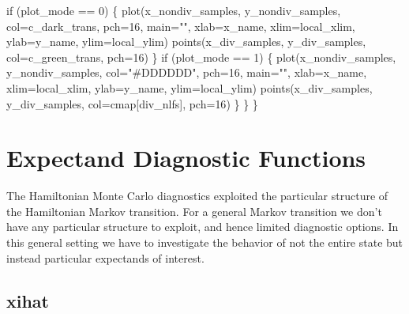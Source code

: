 \documentclass[
  letterpaper,
  DIV=11,
  numbers=noendperiod]{scrartcl}
\newenvironment{Shaded}{\begin{snugshade}}{\end{snugshade}}
\newcommand{\ControlFlowTok}[1]{\textcolor[rgb]{0.00,0.23,0.31}{#1}}
\newcommand{\DecValTok}[1]{\textcolor[rgb]{0.68,0.00,0.00}{#1}}
\newcommand{\NormalTok}[1]{\textcolor[rgb]{0.00,0.23,0.31}{#1}}
\newcommand{\OperatorTok}[1]{\textcolor[rgb]{0.37,0.37,0.37}{#1}}
\newcommand{\StringTok}[1]{\textcolor[rgb]{0.13,0.47,0.30}{#1}}
\begin{document}
\begin{Shaded}
\begin{Highlighting}[]
    \ControlFlowTok{if}\NormalTok{ (plot\_mode }\OperatorTok{==} \DecValTok{0}\NormalTok{) \{}
\NormalTok{      plot(x\_nondiv\_samples, y\_nondiv\_samples,}
\NormalTok{           col}\OperatorTok{=}\NormalTok{c\_dark\_trans, pch}\OperatorTok{=}\DecValTok{16}\NormalTok{, main}\OperatorTok{=}\StringTok{""}\NormalTok{,}
\NormalTok{           xlab}\OperatorTok{=}\NormalTok{x\_name, xlim}\OperatorTok{=}\NormalTok{local\_xlim, }
\NormalTok{           ylab}\OperatorTok{=}\NormalTok{y\_name, ylim}\OperatorTok{=}\NormalTok{local\_ylim)}
\NormalTok{      points(x\_div\_samples, y\_div\_samples,}
\NormalTok{             col}\OperatorTok{=}\NormalTok{c\_green\_trans, pch}\OperatorTok{=}\DecValTok{16}\NormalTok{)}
\NormalTok{    \}}
    \ControlFlowTok{if}\NormalTok{ (plot\_mode }\OperatorTok{==} \DecValTok{1}\NormalTok{) \{}
\NormalTok{      plot(x\_nondiv\_samples, y\_nondiv\_samples,}
\NormalTok{           col}\OperatorTok{=}\StringTok{"\#DDDDDD"}\NormalTok{, pch}\OperatorTok{=}\DecValTok{16}\NormalTok{, main}\OperatorTok{=}\StringTok{""}\NormalTok{,}
\NormalTok{           xlab}\OperatorTok{=}\NormalTok{x\_name, xlim}\OperatorTok{=}\NormalTok{local\_xlim, }
\NormalTok{           ylab}\OperatorTok{=}\NormalTok{y\_name, ylim}\OperatorTok{=}\NormalTok{local\_ylim)}
\NormalTok{      points(x\_div\_samples, y\_div\_samples,}
\NormalTok{             col}\OperatorTok{=}\NormalTok{cmap[div\_nlfs], pch}\OperatorTok{=}\DecValTok{16}\NormalTok{)}
\NormalTok{    \}}
\NormalTok{  \}}
\NormalTok{\}}
\end{Highlighting}
\end{Shaded}

\hypertarget{expectand-diagnostic-functions}{%
\section{Expectand Diagnostic
Functions}\label{expectand-diagnostic-functions}}

The Hamiltonian Monte Carlo diagnostics exploited the particular
structure of the Hamiltonian Markov transition. For a general Markov
transition we don't have any particular structure to exploit, and hence
limited diagnostic options. In this general setting we have to
investigate the behavior of not the entire state but instead particular
expectands of interest.

\hypertarget{xihat}{%
\subsection{xihat}\label{xihat}}
\end{document}
